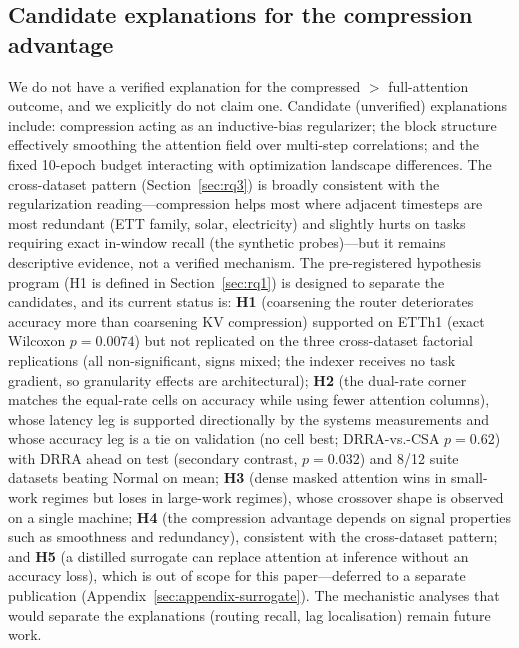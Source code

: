\subsection{Candidate explanations for the compression advantage}
We do not have a verified explanation for the compressed $>$ full-attention
outcome, and we explicitly do not claim one. Candidate (unverified)
explanations include: compression acting as an inductive-bias regularizer;
the block structure effectively smoothing the attention field over
multi-step correlations; and the fixed 10-epoch budget interacting with
optimization landscape differences. The cross-dataset pattern
(Section~\ref{sec:rq3}) is broadly consistent with the regularization
reading---compression helps most where adjacent timesteps are most
redundant (ETT family, solar, electricity) and slightly hurts on tasks
requiring exact in-window recall (the synthetic probes)---but it remains
descriptive evidence, not a verified mechanism. The pre-registered
hypothesis program (H1 is defined in Section~\ref{sec:rq1}) is designed to
separate the candidates, and its current status is:
\textbf{H1} (coarsening the router deteriorates accuracy more than
coarsening KV compression) supported on ETTh1 (exact Wilcoxon $p = 0.0074$) but not
replicated on the three cross-dataset factorial replications (all non-significant,
signs mixed; the indexer receives no task gradient, so granularity effects are architectural);
\textbf{H2} (the dual-rate corner matches the equal-rate cells on accuracy while
using fewer attention columns), whose latency leg is supported directionally by the
systems measurements and whose accuracy leg is a tie on validation (no cell best;
DRRA-vs.-CSA $p = 0.62$) with DRRA ahead on test (secondary contrast, $p = 0.032$) and 8/12 suite datasets
beating Normal on mean;
\textbf{H3} (dense masked attention wins in small-work regimes but loses in
large-work regimes), whose crossover shape is observed on a single machine;
\textbf{H4} (the compression advantage depends on signal properties such as
smoothness and redundancy), consistent with the cross-dataset pattern; and
\textbf{H5} (a distilled surrogate can replace attention at inference
without an accuracy loss), which is out of scope for this paper---deferred
to a separate publication (Appendix~\ref{sec:appendix-surrogate}). The
mechanistic analyses that
would separate the explanations (routing recall, lag localisation) remain
future work.

